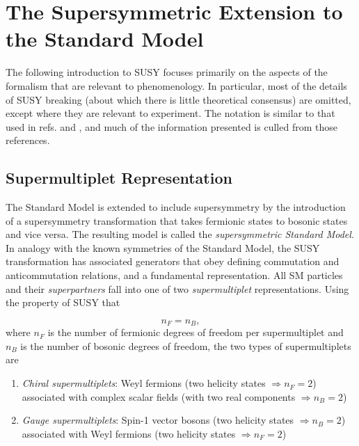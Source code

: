 \documentclass[dissertation.tex]{subfiles}
\begin{document}
\chapter{The Supersymmetric Extension to the Standard Model}
\label{chap:The Supersymmetric Extension to the Standard Model}

The following introduction to SUSY focuses primarily on the aspects of the formalism that are relevant to phenomenology.  In particular, most of the details of SUSY breaking (about which there is little theoretical consensus) are omitted, except where they are relevant to experiment.  The notation is similar to that used in refs. \cite{Aitchison} and \cite{SUSY_primer}, and much of the information presented is culled from those references.

\section{Supermultiplet Representation}
\label{sec:Supermultiplet Representation}

The Standard Model is extended to include supersymmetry by the introduction of a supersymmetry transformation that takes fermionic states to bosonic states and vice versa.  The resulting model is called the \textit{supersymmetric Standard Model}.  In analogy with the known symmetries of the Standard Model, the SUSY transformation has associated generators that obey defining commutation and anticommutation relations, and a fundamental representation.  All SM particles and their \textit{superpartners} fall into one of two \textit{supermultiplet} representations.  Using the property of SUSY that

\begin{equation}
n_{F} = n_{B},
\end{equation}
%
where $n_{F}$ is the number of fermionic degrees of freedom per supermultiplet and $n_{B}$ is the number of bosonic degrees of freedom, the two types of supermultiplets are

\begin{enumerate}
  \item \textit{Chiral supermultiplets}: Weyl fermions (two helicity states $\Rightarrow n_{F} = 2$) associated with complex scalar fields (with two real components $\Rightarrow n_{B} = 2$)
  \item \textit{Gauge supermultiplets}: Spin-1 vector bosons (two helicity states $\Rightarrow n_{B} = 2$) associated with Weyl fermions (two helicity states $\Rightarrow n_{F} = 2$)
\end{enumerate}
\end{document}
